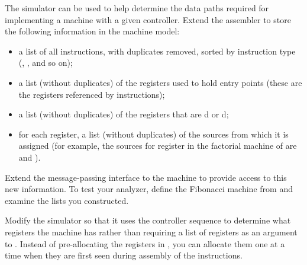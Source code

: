 \begin{exercise}
	\label{Exercise 5.12}
	The simulator can be used to help determine the data paths required for implementing a machine with a given controller.
	Extend the assembler to store the following information in the machine model:
	\begin{itemize}

		\item
			a list of all instructions, with duplicates removed, sorted by instruction type (, , and so on);

		\item
			a list (without duplicates) of the registers used to hold entry points (these are the registers referenced by  instructions);

		\item
			a list (without duplicates) of the registers that are d or d;

		\item
			for each register, a list (without duplicates) of the sources from which it is assigned (for example, the sources for register  in the factorial machine of  are  and ).

	\end{itemize}
	Extend the message-passing interface to the machine to provide access to this new information.
	To test your analyzer, define the Fibonacci machine from  and examine the lists you constructed.
\end{exercise}



\begin{exercise}
	\label{Exercise 5.13}
	Modify the simulator so that it uses the controller sequence to determine what registers the machine has rather than requiring a list of registers as an argument to .
	Instead of pre-allocating the registers in , you can allocate them one at a time when they are first seen during assembly of the instructions.
\end{exercise}
